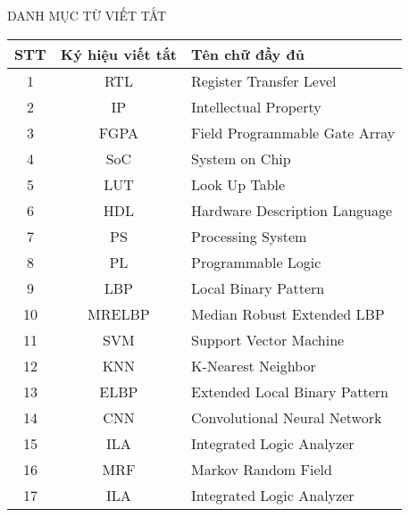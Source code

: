 \documentclass[a4paper,12pt,oneside]{book}%
\renewcommand{\baselinestretch}{1.4}
\begin{document}
\fontsize{13}{15.5}\selectfont


\newpage
\pagestyle{empty}

\newpage
\pagestyle{plain}

\newpage
\def\baselinestretch{1.3}
\pagestyle{plain}

\newpage
 
\newpage

\newpage
{}


\setlength{\parindent}{1cm}
\setlength{\parskip}{0.6ex}

\fontsize{13}{16}\selectfont
\renewcommand{\contentsname}{\vspace{-70pt}\centerline{\fontsize{14}{16}\selectfont\MakeUppercase{Mục lục}}}
\clearpage
{}
{}
\tableofcontents
\clearpage
{}
{}
\renewcommand{\chaptername}{}
\begin{center}
	\vspace*{-40pt}
	{\fontsize{14}{16}\selectfont\MakeUppercase{Danh mục từ viết tắt}}
\end{center}
\vspace{10pt}
\begin{center}
	\begin{tabular}{|c|c|l|}
		\hline
		\textbf{STT} & \textbf{Ký hiệu viết tắt} & \textbf{Tên chữ đầy đủ} \\
		\hline
		1 & RTL & Register Transfer Level \\
		2 & IP & Intellectual Property \\
		3 & FGPA & Field Programmable Gate Array \\
		4 & SoC & System on Chip \\
		5 & LUT & Look Up Table \\
		6 & HDL & Hardware Description Language \\
		7 & PS & Processing System \\
		8 & PL & Programmable Logic \\
		9 & LBP & Local Binary Pattern \\
		10 & MRELBP & Median Robust Extended LBP \\
		11 & SVM & Support Vector Machine \\
		12 & KNN & K-Nearest Neighbor \\
		13 & ELBP & Extended Local Binary Pattern \\ 
		14 & CNN & Convolutional Neural Network \\ 
		15 & ILA & Integrated Logic Analyzer
	\\	16 & MRF & Markov Random Field \\ 
		17 & ILA & Integrated Logic Analyzer
	\\
		\hline
	\end{tabular}
\end{center}
\vspace{20pt}
\fontsize{13}{16}\selectfont
\end{document}
